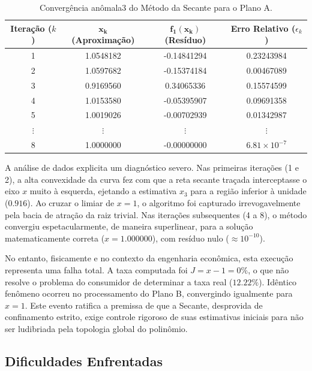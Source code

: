 \begin{table}[htpb]
\centering
\caption{Convergência anômala3 do Método da Secante para o Plano A.}
\label{tab:secante_juros}
\small
\begin{tabular}{@{}cccc@{}}
\toprule
\textbf{Iteração ($k$)} & $\mathbf{x_k}$ (Aproximação) & $\mathbf{f_1(x_k)}$ (Resíduo) & \textbf{Erro Relativo} ($\epsilon_k$) \\ \midrule
1 & 1.0548182 & -0.14841294 & 0.23243984 \\
2 & 1.0597682 & -0.15374184 & 0.00467089 \\
3 & 0.9169560 & \phantom{-}0.34065336 & 0.15574599 \\
4 & 1.0153580 & -0.05395907 & 0.09691358 \\
5 & 1.0019026 & -0.00702939 & 0.01342987 \\
$\vdots$ & $\vdots$ & $\vdots$ & $\vdots$ \\
8 & 1.0000000 & -0.00000000 & $6.81 \times 10^{-7}$ \\ \bottomrule
\end{tabular}
\end{table}

A análise de dados explicita um diagnóstico severo. Nas primeiras iterações (1 e 2), a alta convexidade da curva fez com que a reta secante traçada interceptasse o eixo $x$ muito à esquerda, ejetando a estimativa $x_3$ para a região inferior à unidade ($0.916$). Ao cruzar o limiar de $x=1$, o algoritmo foi capturado irrevogavelmente pela bacia de atração da raiz trivial. Nas iterações subsequentes (4 a 8), o método convergiu espetacularmente, de maneira superlinear, para a solução matematicamente correta ($x = 1.000000$), com resíduo nulo ($\approx 10^{-10}$).

No entanto, fisicamente e no contexto da engenharia econômica, esta execução representa uma falha total. A taxa computada foi $J = x - 1 = 0\%$, o que não resolve o problema do consumidor de determinar a taxa real ($12.22\%$). Idêntico fenômeno ocorreu no processamento do Plano B, convergindo igualmente para $x=1$. Este evento ratifica a premissa de que a Secante, desprovida de confinamento estrito, exige controle rigoroso de suas estimativas iniciais para não ser ludibriada pela topologia global do polinômio.

\subsection{Dificuldades Enfrentadas}
\label{subsec:dificuldades_secante}

